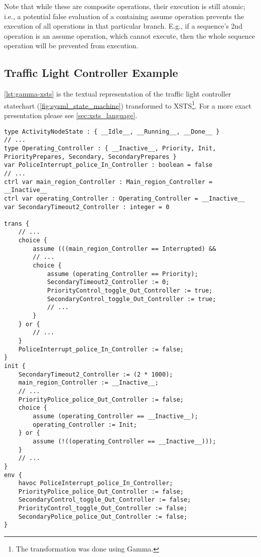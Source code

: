 Note that while these are composite operations, their execution is still atomic; i.e., a potential false evaluation of a containing assume operation prevents the execution of all operations in that particular branch. E.g., if a sequence's 2nd operation is an assume operation, which cannot execute, then the whole sequence operation will be prevented from execution.

\subsection{Traffic Light Controller Example}

\autoref{lst:gamma-xsts} is the textual representation of the traffic light controller statechart (\autoref{fig:sysml_state_machine}) transformed to XSTS\footnote{The transformation was done using Gamma.}. For a more exact presentation please see \autoref{sec:xsts_language}.

\begin{lstlisting}[float,language=xsts, caption={Gamma XSTS Language representing the traffic light controller statechart.}, label={lst:gamma-xsts}]
type ActivityNodeState : { __Idle__, __Running__, __Done__ }
// ...
type Operating_Controller : { __Inactive__, Priority, Init, PriorityPrepares, Secondary, SecondaryPrepares }
var PoliceInterrupt_police_In_Controller : boolean = false
// ...
ctrl var main_region_Controller : Main_region_Controller = __Inactive__
ctrl var operating_Controller : Operating_Controller = __Inactive__
var SecondaryTimeout2_Controller : integer = 0

trans {
	// ...
	choice {
		assume (((main_region_Controller == Interrupted) && 
		// ...
		choice {
			assume (operating_Controller == Priority);
			SecondaryTimeout2_Controller := 0;
			PriorityControl_toggle_Out_Controller := true;
			SecondaryControl_toggle_Out_Controller := true;
			// ...
		}
	} or {
		// ...
	}
	PoliceInterrupt_police_In_Controller := false;
}
init {
	SecondaryTimeout2_Controller := (2 * 1000);
	main_region_Controller := __Inactive__;
	// ...
	PriorityPolice_police_Out_Controller := false;
	choice {
		assume (operating_Controller == __Inactive__);
		operating_Controller := Init;
	} or {
		assume (!((operating_Controller == __Inactive__)));
	}
	// ...
}
env {
	havoc PoliceInterrupt_police_In_Controller;
	PriorityPolice_police_Out_Controller := false;
	SecondaryControl_toggle_Out_Controller := false;
	PriorityControl_toggle_Out_Controller := false;
	SecondaryPolice_police_Out_Controller := false;
}
\end{lstlisting}
